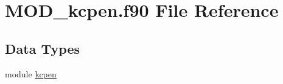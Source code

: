 \hypertarget{MOD__kcpen_8f90}{\section{M\-O\-D\-\_\-kcpen.\-f90 File Reference}
\label{MOD__kcpen_8f90}
}
\subsection*{Data Types}
\begin{DoxyCompactItemize}
\item 
module \hyperlink{classkcpen}{kcpen}
\end{DoxyCompactItemize}
